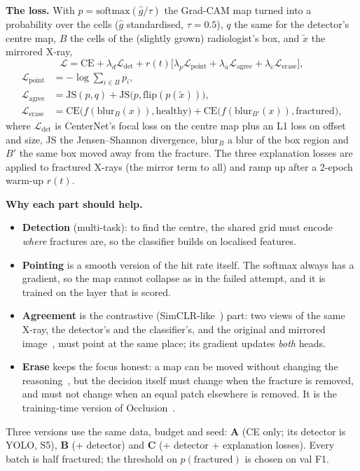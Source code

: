 \documentclass[conference]{IEEEtran}
\begin{document}
\textbf{The loss.} With $p=\mathrm{softmax}(\hat g/\tau)$ the Grad-CAM map turned into a probability over the cells
($\hat g$ standardised, $\tau=0.5$), $q$ the same for the detector's centre map, $B$ the cells of the (slightly grown)
radiologist's box, and $\tilde x$ the mirrored X-ray,
\begin{equation}
\mathcal{L}=\mathrm{CE}+\lambda_d\mathcal{L}_{\text{det}}+r(t)\big[\lambda_p\mathcal{L}_{\text{point}}
+\lambda_a\mathcal{L}_{\text{agree}}+\lambda_e\mathcal{L}_{\text{erase}}\big],
\end{equation}
\begin{align}
\mathcal{L}_{\text{point}}&=-\log\textstyle\sum_{i\in B}p_i,\\
\mathcal{L}_{\text{agree}}&=\mathrm{JS}(p,q)+\mathrm{JS}\big(p,\mathrm{flip}(p(\tilde x))\big),\\
\mathcal{L}_{\text{erase}}&=\mathrm{CE}\big(f(\mathrm{blur}_B(x)),\text{healthy}\big)
+\mathrm{CE}\big(f(\mathrm{blur}_{B'}(x)),\text{fractured}\big),
\end{align}
where $\mathcal{L}_{\text{det}}$ is CenterNet's focal loss on the centre map plus an L1 loss on offset and size, JS the
Jensen--Shannon divergence, $\mathrm{blur}_B$ a blur of the box region and $B'$ the same box moved away from the
fracture. The three explanation losses are applied to fractured X-rays (the mirror term to all) and ramp up after a
2-epoch warm-up $r(t)$.

\textbf{Why each part should help.}
\begin{itemize}
\item \textbf{Detection} (multi-task): to find the centre, the shared grid must encode \emph{where} fractures are, so
the classifier builds on localised features.
\item \textbf{Pointing} is a smooth version of the hit rate itself. The softmax always has a gradient, so the map cannot
collapse as in the failed attempt, and it is trained on the layer that is scored.
\item \textbf{Agreement} is the contrastive (SimCLR-like~\cite{chen2020simclr}) part: two views of the same X-ray, the
detector's and the classifier's, and the original and mirrored image~\cite{guo2019consistency}, must point at the same
place; its gradient updates \emph{both} heads.
\item \textbf{Erase} keeps the focus honest: a map can be moved without changing the reasoning~\cite{heo2019fooling},
but the decision itself must change when the fracture is removed, and must not change when an equal patch elsewhere is
removed. It is the training-time version of Occlusion~\cite{li2018gain}.
\end{itemize}
Three versions use the same data, budget and seed: \textbf{A} (CE only; its detector is YOLO, S5), \textbf{B} (+
detector) and \textbf{C} (+ detector + explanation losses). Every batch is half fractured; the threshold on
$p(\text{fractured})$ is chosen on val F1.
\end{document}
